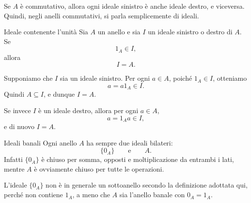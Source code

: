 \documentclass[a4paper]{article}
\begin{document}
\begin{radioactive}
\begin{snippetremark}{}
    Se \(A\) è commutativo, allora ogni ideale sinistro è anche ideale destro, e viceversa. Quindi, negli anelli commutativi, si parla semplicemente di ideali.
\end{snippetremark}
\end{radioactive}

\begin{radioactive}
\begin{snippetproposition}{Ideale contenente l'unità}
    Sia \(A\) un anello e sia \(I\) un ideale sinistro o destro di \(A\).
    Se
    \[
        1_A \in I,
    \]
    allora
    \[
        I=A.
    \]
\end{snippetproposition}
\end{radioactive}

\begin{radioactive}
\begin{snippetproof}{}
    Supponiamo che \(I\) sia un ideale sinistro. Per ogni \(a \in A\), poiché \(1_A \in I\), otteniamo
    \[
        a=a1_A \in I.
    \]
    Quindi \(A \subseteq I\), e dunque \(I=A\).

    Se invece \(I\) è un ideale destro, allora per ogni \(a \in A\),
    \[
        a=1_Aa \in I,
    \]
    e di nuovo \(I=A\).
\end{snippetproof}
\end{radioactive}

\begin{radioactive}
\begin{snippetexample}{Ideali banali}
    Ogni anello \(A\) ha sempre due ideali bilateri:
    \[
        \{0_A\}
        \qquad
        \text{e}
        \qquad
        A.
    \]
    Infatti \(\{0_A\}\) è chiuso per somma, opposti e moltiplicazione da entrambi i lati, mentre \(A\) è ovviamente chiuso per tutte le operazioni.
\end{snippetexample}
\end{radioactive}

\begin{radioactive}
\begin{snippetremark}{}
    L'ideale \(\{0_A\}\) non è in generale un sottoanello secondo la definizione adottata qui, perché non contiene \(1_A\), a meno che \(A\) sia l'anello banale con \(0_A=1_A\).
\end{snippetremark}
\end{radioactive}
\end{document}
